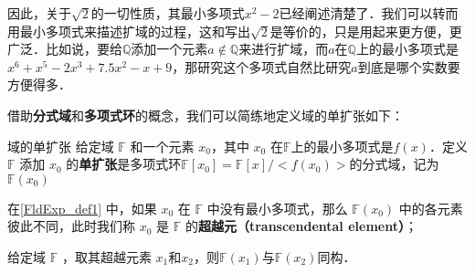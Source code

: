 因此，关于$\sqrt{2}$的一切性质，其最小多项式$x^2-2$已经阐述清楚了．我们可以转而用最小多项式来描述扩域的过程，这和写出$\sqrt{2}$是等价的，只是用起来更方便，更广泛．比如说，要给$\mathbb{Q}$添加一个元素$a\not\in \mathbb{Q}$来进行扩域，而$a$在$\mathbb{Q}$上的最小多项式是$x^6+x^5-2x^3+7.5x^2-x+9$，那研究这个多项式自然比研究$a$到底是哪个实数要方便得多．



借助\textbf{分式域}和\textbf{多项式环}的概念，我们可以简练地定义域的单扩张如下：



\begin{definition}{域的单扩张}\label{FldExp_def1}
给定域 $\mathbb{F}$ 和一个元素 $x_0$，其中 $x_0$ 在$\mathbb{F}$上的最小多项式是$f(x)$．定义 $\mathbb{F}$ 添加 $x_0$ 的\textbf{单扩张}是多项式环$\mathbb{F}[x_0]=\mathbb{F}[x]/<f(x_0)>$的分式域，记为$\mathbb{F}(x_0)$
\end{definition}



在\autoref{FldExp_def1} 中，如果 $x_0$ 在 $\mathbb{F}$ 中没有最小多项式，那么 $\mathbb{F}(x_0)$ 中的各元素彼此不同，此时我们称 $x_0$ 是 $\mathbb{F}$ 的\textbf{超越元（transcendental element）}； 


\begin{theorem}{}
给定域 $\mathbb{F}$ ，取其超越元素 $x_1$和$x_2$，则$\mathbb{F}(x_1)$与$\mathbb{F}(x_2)$同构．
\end{theorem}

